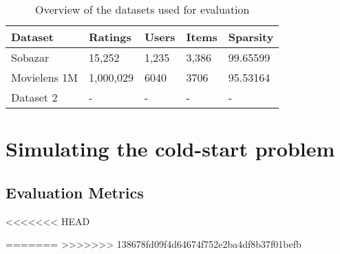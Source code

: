 

\begin{table}[H]
    \centering
    \begin{tabular}{|l|l|l|l|l|}
    \hline
	Dataset			& 	Ratings 	& 	Users	& 	Items 	& 	Sparsity 	\\ \hline
	Sobazar 		& 	15,252  	& 	1,235	&	3,386	&	99.65599	\\ \hline
	Movielens 1M	& 	1,000,029   &	6040 	&	3706	&	95.53164	\\ \hline
	Dataset 2 		& 	-  			& 	-		&	-		&	-			\\ \hline
    \end{tabular}
    \label{table:datasets}
    \caption [Overview of the datasets used for evaluation]{Overview of the datasets used for evaluation}
\end{table}


\section{Simulating the cold-start problem}



\subsection{Evaluation Metrics}
<<<<<<< HEAD



=======
>>>>>>> 138678fd09f4d64674f752e2ba4df8b37f01befb

